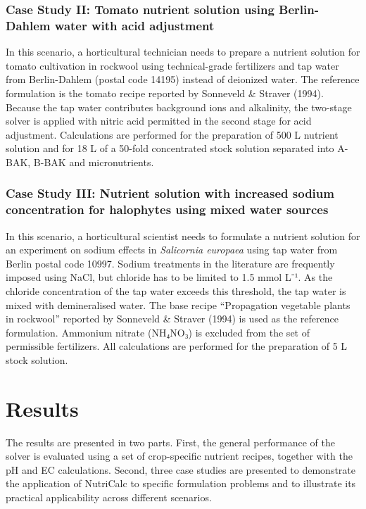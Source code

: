 \documentclass[
  letterpaper,
  DIV=11,
  numbers=noendperiod]{scrreprt}
\begin{document}
\subsection{Case Study II: Tomato nutrient solution using Berlin-Dahlem
water with acid
adjustment}\label{case-study-ii-tomato-nutrient-solution-using-berlin-dahlem-water-with-acid-adjustment}

In this scenario, a horticultural technician needs to prepare a nutrient
solution for tomato cultivation in rockwool using technical-grade
fertilizers and tap water from Berlin-Dahlem (postal code 14195) instead
of deionized water. The reference formulation is the tomato recipe
reported by Sonneveld \& Straver (1994). Because the tap water
contributes background ions and alkalinity, the two-stage solver is
applied with nitric acid permitted in the second stage for acid
adjustment. Calculations are performed for the preparation of 500 L
nutrient solution and for 18 L of a 50-fold concentrated stock solution
separated into A-BAK, B-BAK and micronutrients.

\subsection{Case Study III: Nutrient solution with increased sodium
concentration for halophytes using mixed water
sources}\label{case-study-iii-nutrient-solution-with-increased-sodium-concentration-for-halophytes-using-mixed-water-sources}

In this scenario, a horticultural scientist needs to formulate a
nutrient solution for an experiment on sodium effects in
\emph{Salicornia europaea} using tap water from Berlin postal code
10997. Sodium treatments in the literature are frequently imposed using
NaCl, but chloride has to be limited to 1.5 mmol L⁻¹. As the chloride
concentration of the tap water exceeds this threshold, the tap water is
mixed with demineralised water. The base recipe ``Propagation vegetable
plants in rockwool'' reported by Sonneveld \& Straver (1994) is used as
the reference formulation. Ammonium nitrate (NH₄NO₃) is excluded from
the set of permissible fertilizers. All calculations are performed for
the preparation of 5 L stock solution.

\chapter{Results}\label{results}

The results are presented in two parts. First, the general performance
of the solver is evaluated using a set of crop-specific nutrient
recipes, together with the pH and EC calculations. Second, three case
studies are presented to demonstrate the application of NutriCalc to
specific formulation problems and to illustrate its practical
applicability across different scenarios.
\end{document}
